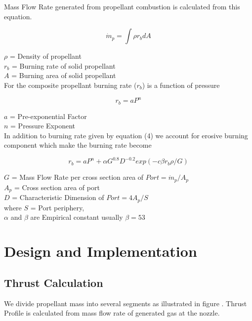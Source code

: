 \documentclass[conference]{IEEEtran}
\begin{document}
Mass Flow Rate generated from propellant combustion is calculated from this equation. 
\begin{center}
\begin{equation}
\dot{m}_{p} = \int\rho{r}_bdA
\end{equation}
\end{center}
$\rho$ = Density of propellant\\
${r}_b$ = Burning rate of solid propellant\\		
$A$ = Burning area of solid propellant\\

For the composite propellant burning rate (${r}_b$) is a function of pressure  
\begin{center}
\begin{equation}
{r}_b = aP^{n}
\end{equation}
\end{center}
$a$ = Pre-exponential Factor\\ 
$n$ = Pressure Exponent \\		

In addition to burning rate given by equation (4) we account for erosive burning component which make the burning rate become 
\begin{center}
\begin{equation}
{r}_b = aP^{n} + \alpha G^{0.8}D^{-0.2}exp(-c\beta{r}_b\rho/G)
\end{equation}
\end{center}
$G$ = Mass Flow Rate per cross section area of $Port = \dot{m}_{p}/{A}_p$\\
${A}_p$ = Cross section area of port\\		
$D$ = Characteristic Dimension of $Port = 4{A}_p/S$ \\
where $S$ = Port periphery, \\
$\alpha$ and $\beta$ are Empirical constant usually $\beta = 53$



\section{Design and Implementation}

\subsection{Thrust Calculation}
We divide propellant mass into several segments as illustrated in figure . Thrust Profile is calculated from mass flow rate of generated gas at the nozzle. 
\end{document}
